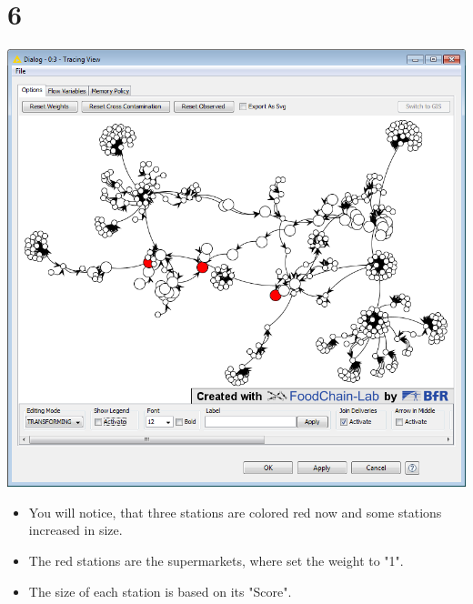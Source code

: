 \documentclass{beamer}
\begin{document}
\section{6}
\begin{frame}
	\begin{center}
  		\includegraphics[height=0.6\textheight]{6.png}
	\end{center}
	\begin{itemize}
		\item You will notice, that three stations are colored red now and some stations increased in size.
		\item The red stations are the supermarkets, where set the weight to "1".
		\item The size of each station is based on its "Score".
	\end{itemize}
\end{frame}
\end{document}

